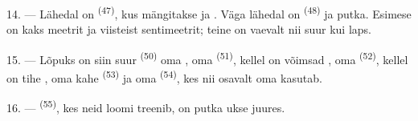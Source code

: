 14. --- Lähedal on  \textsuperscript{(47)}, kus mängitakse
 ja . Väga lähedal on 
\textsuperscript{(48)} ja  putka. Esimese  on kaks meetrit
ja viisteist sentimeetrit; teine on vaevalt nii suur kui laps.

15. --- Lõpuks on siin suur  \textsuperscript{(50)} oma
, oma  \textsuperscript{(51)}, kellel on võimsad
, oma  \textsuperscript{(52)}, kellel on tihe ,
oma kahe  \textsuperscript{(53)} ja oma 
\textsuperscript{(54)}, kes nii osavalt oma  kasutab.

16. ---  \textsuperscript{(55)}, kes neid loomi treenib, on putka ukse
juures.

\VUsaut{6.0mm}
\VUfilet{22mm}
